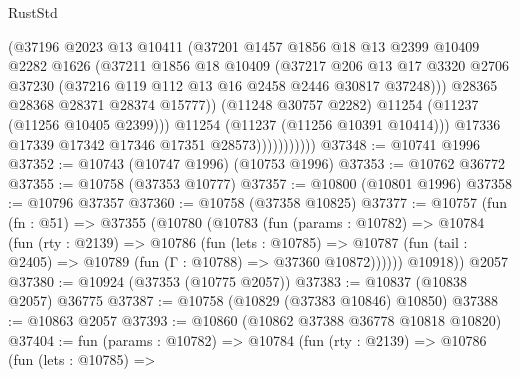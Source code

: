 \begin{lexlean}{RustStd}
\begin{coremodule}
                              (@37196
                                @2023
                                @13
                                @10411
                                (@37201
                                  @1457
                                  @1856
                                  @18
                                  @13
                                  @2399
                                  @10409
                                  @2282
                                  @1626
                                  (@37211
                                    @1856
                                    @18
                                    @10409
                                    (@37217
                                      @206
                                      @13
                                      @17
                                      @3320
                                      @2706
                                      @37230
                                      (@37216 @119 @112 @13 @16 @2458 @2446 @30817 @37248)))
                                  @28365
                                  @28368
                                  @28371
                                  @28374
                                  @15777))
                              (@11248 @30757 @2282)
                              @11254
                              (@11237 (@11256 @10405 @2399)))
                            @11254
                            (@11237 (@11256 @10391 @10414)))
                          @17336
                          @17339
                          @17342
                          @17346
                          @17351
                          @28573)))))))))))
@37348 := @10741 @1996
@37352 := @10743 (@10747 @1996) (@10753 @1996)
@37353 := @10762 @36772
@37355 := @10758 (@37353 @10777)
@37357 := @10800 (@10801 @1996)
@37358 := @10796 @37357
@37360 := @10758 (@37358 @10825)
@37377 := @10757
    (fun (fn : @51) =>
    @37355
      (@10780
        (@10783
          (fun (params : @10782) =>
          @10784
            (fun (rty : @2139) =>
            @10786
              (fun (lets : @10785) =>
              @10787 (fun (tail : @2405) => @10789 (fun (Γ : @10788) => @37360 @10872))))))
        @10918))
    @2057
@37380 := @10924 (@37353 (@10775 @2057))
@37383 := @10837 (@10838 @2057) @36775
@37387 := @10758 (@10829 (@37383 @10846) @10850)
@37388 := @10863 @2057
@37393 := @10860 (@10862 @37388 @36778 @10818 @10820)
@37404 := fun (params : @10782) =>
  @10784
    (fun (rty : @2139) =>
    @10786
      (fun (lets : @10785) =>

\end{coremodule}
\end{lexlean}
